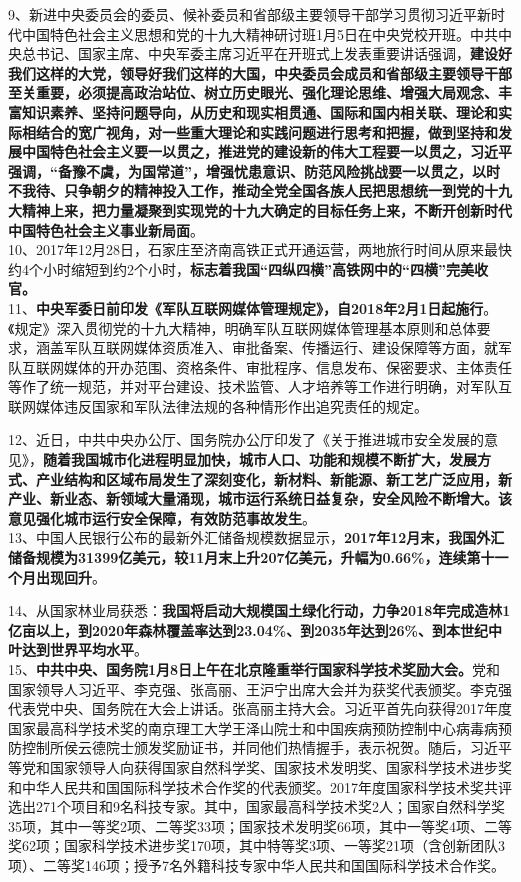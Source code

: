 9、新进中央委员会的委员、候补委员和省部级主要领导干部学习贯彻习近平新时代中国特色社会主义思想和党的十九大精神研讨班1月5日在中央党校开班。中共中央总书记、国家主席、中央军委主席习近平在开班式上发表重要讲话强调，{\textbf{建设好我们这样的大党，领导好我们这样的大国，中央委员会成员和省部级主要领导干部至关重要，必须提高政治站位、树立历史眼光、强化理论思维、增强大局观念、丰富知识素养、坚持问题导向，从历史和现实相贯通、国际和国内相关联、理论和实际相结合的宽广视角，对一些重大理论和实践问题进行思考和把握，做到坚持和发展中国特色社会主义要一以贯之，推进党的建设新的伟大工程要一以贯之，习近平强调，``备豫不虞，为国常道''，增强忧患意识、防范风险挑战要一以贯之，以时不我待、只争朝夕的精神投入工作，推动全党全国各族人民把思想统一到党的十九大精神上来，把力量凝聚到实现党的十九大确定的目标任务上来，不断开创新时代中国特色社会主义事业新局面}}。\\
10、2017年12月28日，石家庄至济南高铁正式开通运营，两地旅行时间从原来最快约4个小时缩短到约2个小时，{\textbf{标志着我国``四纵四横''高铁网中的``四横''完美收官。\\
}}11、{\textbf{中央军委日前印发《军队互联网媒体管理规定》，自2018年2月1日起施行}}。《规定》深入贯彻党的十九大精神，明确军队互联网媒体管理基本原则和总体要求，涵盖军队互联网媒体资质准入、审批备案、传播运行、建设保障等方面，就军队互联网媒体的开办范围、资格条件、审批程序、信息发布、保密要求、主体责任等作了统一规范，并对平台建设、技术监管、人才培养等工作进行明确，对军队互联网媒体违反国家和军队法律法规的各种情形作出追究责任的规定。

12、近日，中共中央办公厅、国务院办公厅印发了《关于推进城市安全发展的意见》，{\textbf{随着我国城市化进程明显加快，城市人口、功能和规模不断扩大，发展方式、产业结构和区域布局发生了深刻变化，新材料、新能源、新工艺广泛应用，新产业、新业态、新领域大量涌现，城市运行系统日益复杂，安全风险不断增大。该意见强化城市运行安全保障，有效防范事故发生}}。\\
13、中国人民银行公布的最新外汇储备规模数据显示，{\textbf{2017年12月末，我国外汇储备规模为31399亿美元，较11月末上升207亿美元，升幅为0.66\%，连续第十一个月出现回升}}。

14、从国家林业局获悉：{\textbf{我国将启动大规模国土绿化行动，力争2018年完成造林1亿亩以上，到2020年森林覆盖率达到23.04\%、到2035年达到26\%、到本世纪中叶达到世界平均水平}}。\\
15、{\textbf{中共中央、国务院1月8日上午在北京隆重举行国家科学技术奖励大会。}}党和国家领导人习近平、李克强、张高丽、王沪宁出席大会并为获奖代表颁奖。李克强代表党中央、国务院在大会上讲话。张高丽主持大会。习近平首先向获得2017年度国家最高科学技术奖的南京理工大学王泽山院士和中国疾病预防控制中心病毒病预防控制所侯云德院士颁发奖励证书，并同他们热情握手，表示祝贺。随后，习近平等党和国家领导人向获得国家自然科学奖、国家技术发明奖、国家科学技术进步奖和中华人民共和国国际科学技术合作奖的代表颁奖。2017年度国家科学技术奖共评选出271个项目和9名科技专家。其中，国家最高科学技术奖2人；国家自然科学奖35项，其中一等奖2项、二等奖33项；国家技术发明奖66项，其中一等奖4项、二等奖62项；国家科学技术进步奖170项，其中特等奖3项、一等奖21项（含创新团队3项）、二等奖146项；授予7名外籍科技专家中华人民共和国国际科学技术合作奖。

